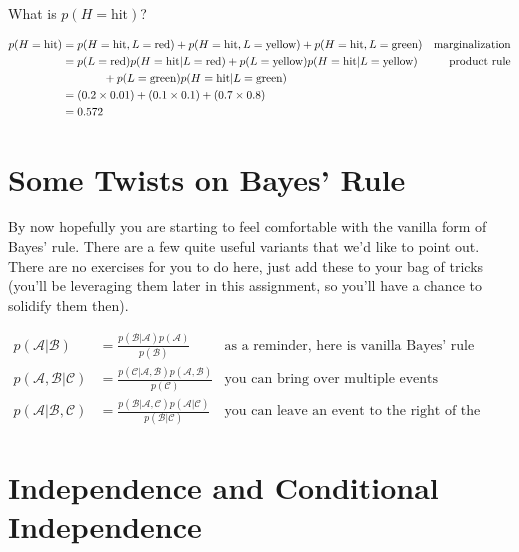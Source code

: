 \documentclass[assignment02_Solutions]{subfiles}
\begin{document}
\begin{exercise}[(15 minutes)]
What is $p(H=\mbox{hit})$?

\begin{boxedsolution}
\begin{align}
p(H = \mbox{hit}) &= p(H = \mbox{hit}, L = \mbox{red}) +  p(H = \mbox{hit}, L = \mbox{yellow}) +  p(H = \mbox{hit}, L = \mbox{green}) &\mbox{marginalization} \nonumber \\
&= p(L = \mbox{red}) p(H = \mbox{hit} | L = \mbox{red}) + p(L = \mbox{yellow}) p(H = \mbox{hit} | L = \mbox{yellow}) &\mbox{product rule}\nonumber \\
&\hspace{0.5in}+ p(L = \mbox{green}) p(H = \mbox{hit} | L = \mbox{green}) \nonumber\\
&= (0.2 \times 0.01) + (0.1 \times 0.1) + (0.7 \times 0.8) \nonumber \\
&= 0.572 \nonumber
\end{align}
\end{boxedsolution}
\end{exercise}

\section{Some Twists on Bayes' Rule}

By now hopefully you are starting to feel comfortable with the vanilla form of Bayes' rule.  There are a few quite useful variants that we'd like to point out.  There are no exercises for you to do here, just add these to your bag of tricks (you'll be leveraging them later in this assignment, so you'll have a chance to solidify them then).

\begin{align}
p(\mathcal{A} | \mathcal{B}) &= \frac{p(\mathcal{B}|\mathcal{A}) p(\mathcal{A})}{p(\mathcal{B})} & \mbox{as a reminder, here is vanilla Bayes' rule} \\
p(\mathcal{A}, \mathcal{B} | \mathcal{C}) &= \frac{p(\mathcal{C}|\mathcal{A}, \mathcal{B}) p(\mathcal{A, B})}{p(\mathcal{C})} & \mbox{you can bring over multiple events} \\
p(\mathcal{A} | \mathcal{B}, \mathcal{C}) &= \frac{p(\mathcal{B} | \mathcal{A}, \mathcal{C}) p(\mathcal{A}|\mathcal{C})}{p(\mathcal{B}|\mathcal{C})} & \mbox{you can leave an event to the right of the conditioning bar}
\end{align}

\section{Independence and Conditional Independence}
\end{document}
